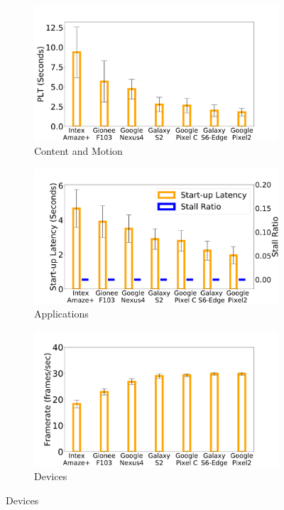 \begin{figure}
    \begin{subfigure}[b]{0.33\textwidth}
        \centering
        \includegraphics[width=1\linewidth]{sections/device-work/plt-devices}
        \caption{Content and Motion}
    \end{subfigure}
    \begin{subfigure}[b]{0.33\textwidth}
        \centering
        \includegraphics[width=1\linewidth]{sections/device-work/youtube-motivation}
        \caption{Applications}
    \end{subfigure}%
    \begin{subfigure}[b]{0.33\textwidth}
        \centering
        \includegraphics[width=1\linewidth]{sections/device-work/skype-motivation}
        \caption{Devices}
    \end{subfigure}
     \vspace*{-1em}
\end{figure}



